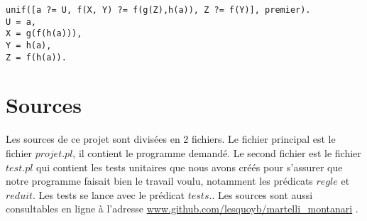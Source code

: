 \documentclass[10pt,a4paper]{report}
\begin{document}
\begin{lstlisting}[caption ={Exemple d'exécution }]
unif([a ?= U, f(X, Y) ?= f(g(Z),h(a)), Z ?= f(Y)], premier).
U = a,
X = g(f(h(a))),
Y = h(a),
Z = f(h(a)).
\end{lstlisting}
\appendix
\chapter{Sources}
Les sources de ce projet sont divisées en 2 fichiers. Le fichier principal est le fichier $projet.pl$, il contient le programme demandé. Le second fichier est le fichier $test.pl$ qui contient les tests unitaires que nous avons créés pour s'assurer que notre programme faisait bien le travail voulu, notamment les prédicats $regle$ et $reduit$. Les tests se lance avec le prédicat $tests.$. Les sources sont aussi consultables en ligne à l'adresse \url{www.github.com/lesquoyb/martelli_montanari} .
\end{document}
